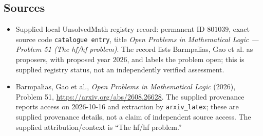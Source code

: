 \documentclass[11pt]{article}
\begin{document}
\subsection{Sources}
\begin{itemize}
\item Supplied local UnsolvedMath registry record: permanent ID \(801039\), exact source code \texttt{catalogue entry}, title \emph{Open Problems in Mathematical Logic --- Problem 51 (The hf/hf problem)}. The record lists Barmpalias, Gao et al. as proposers, with proposed year \(2026\), and labels the problem open; this is supplied registry status, not an independently verified assessment.
\item Barmpalias, Gao et al., \emph{Open Problems in Mathematical Logic} (2026), Problem 51, \url{https://arxiv.org/abs/2608.26628}. The supplied provenance reports access on 2026-10-16 and extraction by \texttt{arxiv\_latex}; these are supplied provenance details, not a claim of independent source access. The supplied attribution/context is ``The hf/hf problem.''
\end{itemize}
\end{document}
